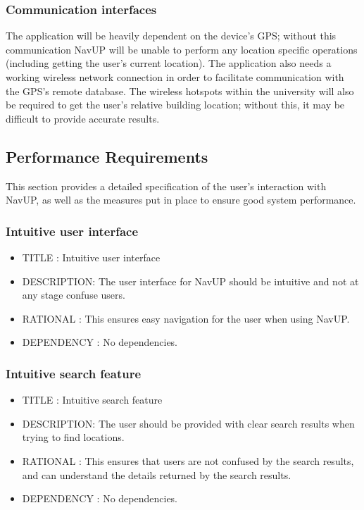 \documentclass{article}
\begin{document}
			\subsubsection{Communication interfaces}
			The application will be heavily dependent on the device's GPS; without this communication NavUP will be unable to perform any location specific operations (including getting the user's current location). The application also needs a working wireless network connection in order to facilitate communication with the GPS's remote database. The wireless hotspots within the university will also be required to get the user's relative building location; without this, it may be difficult to provide accurate results.

			\subsection{Performance Requirements}\label{subsec:performance}
				This section provides a detailed specification of the user's interaction with NavUP, as well as the measures put in place to ensure good system performance.
			
			\subsubsection{Intuitive user interface}
		    \begin{itemize}
		    \item[]TITLE      : Intuitive user interface
		    \item[]DESCRIPTION: The user interface for NavUP should be intuitive and not at any stage confuse users.
		    \item[]RATIONAL   : This ensures easy navigation for the user when using NavUP.
		    \item[]DEPENDENCY : No dependencies.
		    \end{itemize}
			\subsubsection{Intuitive search feature}
			\begin{itemize}
		    \item[]TITLE      : Intuitive search feature
		    \item[]DESCRIPTION: The user should be provided with clear search results when trying to find locations.
		    \item[]RATIONAL   : This ensures that users are not confused by the search results, and can understand the details returned by the search results.
		    \item[]DEPENDENCY : No dependencies.
		    \end{itemize}	
\end{document}
